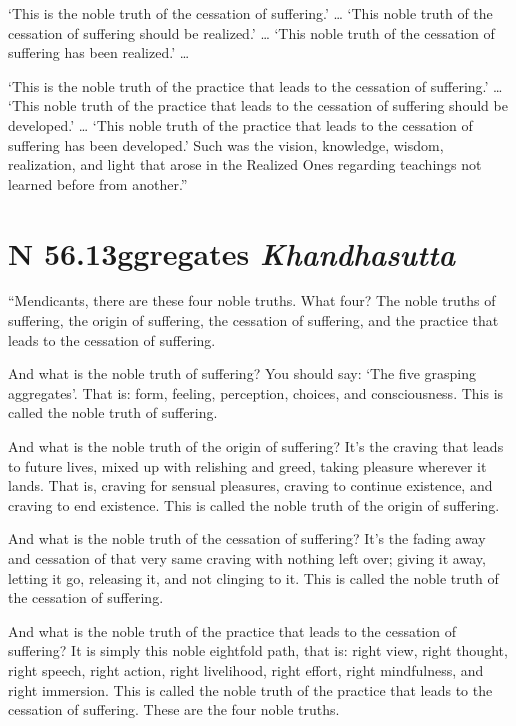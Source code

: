 \documentclass[12pt,openany]{book}%
\newcommand*{\suttatitleacronym}[1]{\smaller[2]{#1}\vspace*{.3em}}
\newcommand*{\suttatitletranslation}[1]{\linebreak{#1}}
\newcommand*{\suttatitleroot}[1]{\linebreak\smaller[2]\itshape{#1}}
\newcommand*{\tocacronym}[1]{\hspace*{-3.3em}{#1}\quad}
\newcommand*{\toctranslation}[1]{#1}
\newcommand*{\tocroot}[1]{(\textit{#1})}
\begin{document}
‘This is the noble truth of the cessation of suffering.’ … ‘This noble truth of the cessation of suffering should be realized.’ … ‘This noble truth of the cessation of suffering has been realized.’ … 

‘This is the noble truth of the practice that leads to the cessation of suffering.’ … ‘This noble truth of the practice that leads to the cessation of suffering should be developed.’ … ‘This noble truth of the practice that leads to the cessation of suffering has been developed.’ Such was the vision, knowledge, wisdom, realization, and light that arose in the Realized Ones regarding teachings not learned before from another.” 

%
\section*{{\suttatitleacronym SN 56.13}{\suttatitletranslation Aggregates }{\suttatitleroot Khandhasutta}}
\addcontentsline{toc}{section}{\tocacronym{SN 56.13} \toctranslation{Aggregates } \tocroot{Khandhasutta}}

“Mendicants, there are these four noble truths. What four? The noble truths of suffering, the origin of suffering, the cessation of suffering, and the practice that leads to the cessation of suffering. 

And what is the noble truth of suffering? You should say: ‘The five grasping aggregates’. That is: form, feeling, perception, choices, and consciousness. This is called the noble truth of suffering. 

And what is the noble truth of the origin of suffering? It’s the craving that leads to future lives, mixed up with relishing and greed, taking pleasure wherever it lands. That is, craving for sensual pleasures, craving to continue existence, and craving to end existence. This is called the noble truth of the origin of suffering. 

And what is the noble truth of the cessation of suffering? It’s the fading away and cessation of that very same craving with nothing left over; giving it away, letting it go, releasing it, and not clinging to it. This is called the noble truth of the cessation of suffering. 

And what is the noble truth of the practice that leads to the cessation of suffering? It is simply this noble eightfold path, that is: right view, right thought, right speech, right action, right livelihood, right effort, right mindfulness, and right immersion. This is called the noble truth of the practice that leads to the cessation of suffering. These are the four noble truths. 
\end{document}
